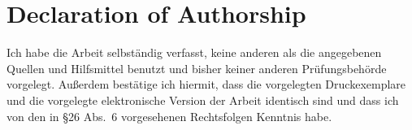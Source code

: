 \printbibliography

\chapter*{Declaration of Authorship}

Ich habe die Arbeit selbst{\"a}ndig verfasst, keine anderen als die angegebenen
Quellen und Hilfsmittel benutzt und bisher keiner anderen
Pr{\"u}fungsbeh{\"o}rde vorgelegt. Au{\ss}erdem best{\"a}tige ich hiermit, dass
die vorgelegten Druckexemplare und die vorgelegte elektronische Version der
Arbeit identisch sind und dass ich von den in \S 26 Abs.\ 6 vorgesehenen
Rechtsfolgen Kenntnis habe.


